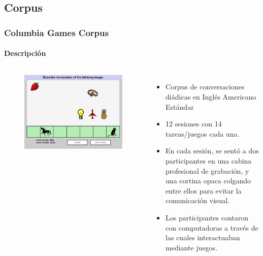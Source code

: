 \subsection{Corpus}
\begin{frame}
  \frametitle{Columbia Games Corpus}
  \framesubtitle{Descripción}
  \begin{columns}
      \begin{figure}
        \includegraphics[width=\textwidth]{images/columbia_games_color.jpg}
      \end{figure}


    \begin{itemize}
      \item Corpus de conversaciones diádicas en Inglés Americano Estándar
      \item 12 sesiones con 14 tareas/juegos cada una.
      \item En cada sesión, se sentó a dos participantes en una cabina profesional de grabación, y una cortina opaca colgando entre ellos para evitar la comunicación visual.
      \item Los participantes contaron con computadoras a través de las cuales interactuaban mediante juegos.
    \end{itemize}
  \end{columns}

\end{frame}



